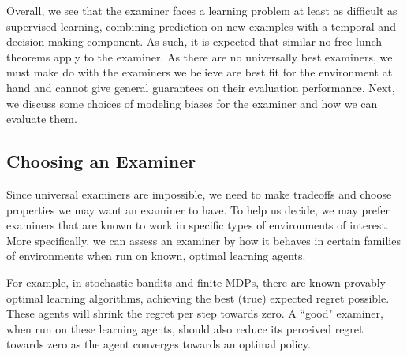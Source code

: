 Overall, we see that the examiner faces a learning problem at least as difficult as supervised learning, combining prediction on new examples with a temporal and decision-making component. 
As such, it is expected that similar no-free-lunch theorems apply to the examiner. 
As there are no universally best examiners, we must make do with the examiners we believe are best fit for the environment at hand and cannot give general guarantees on their evaluation performance.
Next, we discuss some choices of modeling biases for the examiner and how we can evaluate them.






\subsection{Choosing an Examiner}


Since universal examiners are impossible, we need to make tradeoffs and choose properties we may want an examiner to have. To help us decide, we may prefer examiners that are known to work in specific types of environments of interest. 
More specifically, we can assess an examiner by how it behaves in certain families of environments when run on known, optimal learning agents.

For example, in stochastic bandits and finite MDPs, there are known provably-optimal learning algorithms, achieving the best (true) expected regret possible. These agents will shrink the regret per step towards zero. 
A ``good" examiner, when run on these learning agents, should also reduce its perceived regret towards zero as the agent converges towards an optimal policy. 


